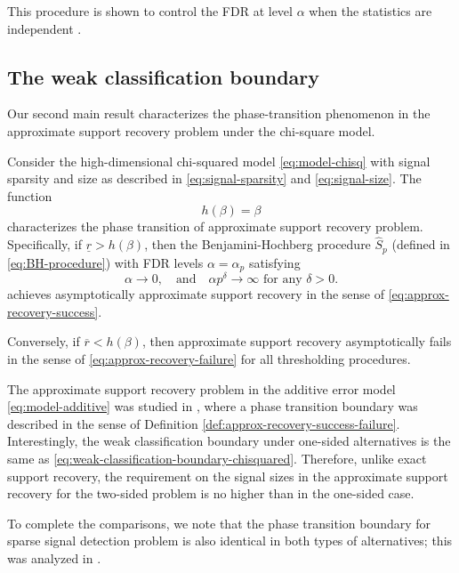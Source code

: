 This procedure is shown to control the FDR at level $\alpha$ when the statistics are
independent \cite{benjamini1995controlling}.

\subsection{The weak classification boundary}
\label{subsec:weak-classification-boundary}

Our second main result characterizes the phase-transition phenomenon in the approximate support recovery problem under the chi-square model.

\begin{theorem} \label{thm:chi-squred-weak-boundary}
Consider the high-dimensional chi-squared model \eqref{eq:model-chisq} with signal sparsity and size as described in \eqref{eq:signal-sparsity} and \eqref{eq:signal-size}.
The function 
\begin{equation} \label{eq:weak-classification-boundary-chisquared}
    h(\beta) = \beta
\end{equation}
characterizes the phase transition of approximate support recovery problem.
Specifically, if $\underline{r} > {h}(\beta)$, then the Benjamini-Hochberg procedure $\widehat{S}_p$ (defined in \eqref{eq:BH-procedure}) with FDR levels $\alpha=\alpha_p$ satisfying
\begin{equation} \label{eq:FDR-rate-to-zero}
    \alpha\to 0,\quad \text{and} \quad \alpha p^\delta\to\infty \text{  for any } \delta>0.
\end{equation}
achieves asymptotically approximate support recovery in the sense of \eqref{eq:approx-recovery-success}. 

Conversely, if $\overline{r} < {h}(\beta)$, then approximate support recovery asymptotically fails in the sense of \eqref{eq:approx-recovery-failure} for all thresholding procedures.
\end{theorem}

\begin{remark}
The approximate support recovery problem in the additive error model \eqref{eq:model-additive} was studied in \cite{arias2017distribution}, where a phase transition boundary was described in the sense of Definition \ref{def:approx-recovery-success-failure}.
Interestingly, the weak classification boundary under one-sided alternatives is the same as \eqref{eq:weak-classification-boundary-chisquared}.
Therefore, unlike exact support recovery, the requirement on the signal sizes in the approximate support recovery for the two-sided problem is no higher than in the one-sided case.

To complete the comparisons, we note that the phase transition boundary for sparse signal detection problem is also identical in both types of alternatives; this was analyzed in \cite{donoho2004higher}.
\end{remark}
